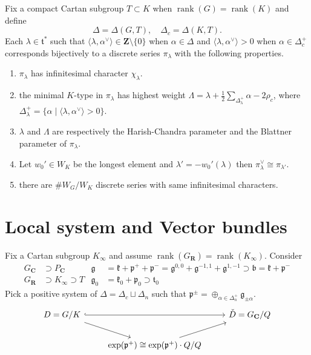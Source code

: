 \documentclass[leqno]{amsart}
\newcommand{\Z}{{\mathbf{Z}}}
\newcommand{\R}{\mathbf R}
\newcommand{\C}{\mathbf C}
\newcommand{\1}{\mathbf{1}}
\newcommand{\rfg}{\mathfrak{g}_0}
\newcommand{\cfg}{\mathfrak{g}}
\newcommand{\rfk}{\mathfrak{k}_0}
\newcommand{\cfk}{\mathfrak{k}}
\newcommand{\rfp}{\mathfrak{p}_0}
\newcommand{\cfp}{\mathfrak{p}}
\newcommand{\rft}{\mathfrak{t}_0}
\newcommand{\cft}{\mathfrak{t}}
\newcommand{\rt}{\Delta}
\DeclareMathOperator{\rank}{rank}
\theoremstyle{definition}
\theoremstyle{remark}
\begin{document}
Fix a compact Cartan subgroup $T\subset K$
when $\rank(G)=\rank(K)$ and define
\[
    \rt=\rt(G,T),\quad
    \rt_c=\rt(K,T).
\]
Each $\lambda\in \cft^*$
such that 
$\langle \lambda,\alpha^\vee\rangle\in \Z\setminus\{0\}$
when $\alpha\in \rt$ and
$\langle \lambda, \alpha^\vee\rangle>0$
when $\alpha\in\rt_c^+$
corresponds bijectively to 
a discrete series $\pi_\lambda$ 
with the following properties.
\begin{enumerate}
    \item $\pi_\lambda$ has infinitesimal character $\chi_\lambda$.
    \item the minimal $K$-type in  $\pi_\lambda$
    has highest weight
    $\Lambda=\lambda
    +\frac{1}{2}\sum_{\Delta_\lambda^+}\alpha-2\rho_c$, 
    where $\Delta_\lambda^+=
    \{\alpha\mid \langle\lambda,\alpha^\vee\rangle>0\}$.
    \item $\lambda$ and  $\Lambda$
    are respectively the Harish-Chandra parameter
    and the Blattner parameter of  $\pi_\lambda$.
    \item Let $w_0'\in W_K$ be the longest element
	    and $\lambda'=-w_0'(\lambda)$
	    then  $\pi_\lambda^\vee\cong \pi_{\lambda'}$.
    \item there are $\# W_G/W_K$ discrete series 
	    with same infinitesimal characters.
\end{enumerate}


\section{Local system and Vector bundles}

Fix a Cartan subgroup $K_\infty$ and assume 
$\rank(G_\R)=\rank(K_\infty)$.
Consider
\begin{align*}
	G_\C&\supset P_\C & 
	\cfg&=\cfk+\cfp^++\cfp^-
	=\cfg^{0,0}+
	\cfg^{-1,1}+
	\cfg^{1,-1} \supset
	\mathfrak{b}=\cfk+\cfp^-\\
	G_\R&\supset K_\infty\supset T &
	\rfg&=\rfk+\rfp\supset \rft
\end{align*}
Pick a positive system of $\rt=\rt_c\sqcup\rt_n$
such that $\cfp^\pm=\oplus_{\alpha\in \Delta_n^+}\cfg_{\pm\alpha}$.
 \[
	 \begin{tikzcd}
		 D=G/K\arrow[rr,hookrightarrow]
		 \arrow[dr]
		 && \check{D}=G_\C/Q\\
		 &
		 \exp(\cfp^+)\cong
		 \exp(\cfp^+)\cdot Q/Q\arrow[ur]&
	 \end{tikzcd}
\]
\end{document}

